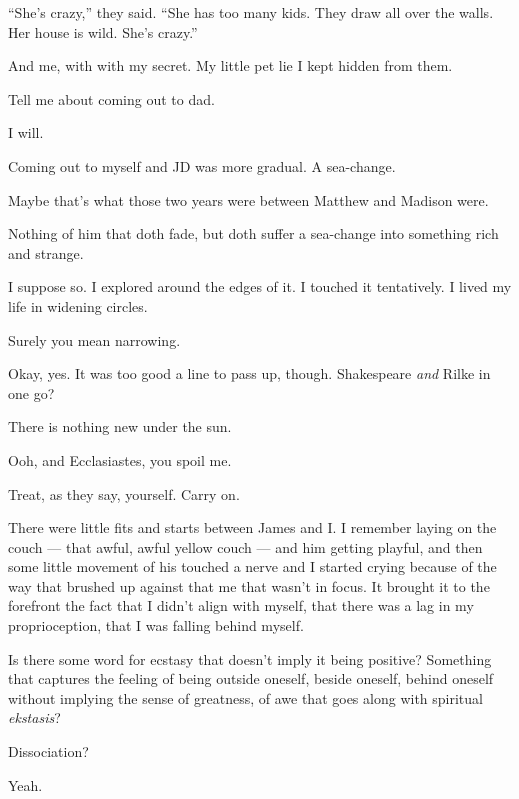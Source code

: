 \begin{paracol}{2}
\begin{leftcolumn}
\begin{ally}
``She's crazy,'' they said. ``She has too many kids. They draw all over the walls. Her house is wild. She's crazy.''
\end{ally}
And me, with with my secret. My little pet lie I kept hidden from them.

\begin{ally}
Tell me about coming out to dad.
\end{ally}
I will.
\newpage

\noindent Coming out to myself and JD was more gradual. A sea-change.

\begin{ally}
Maybe that's what those two years were between Matthew and Madison were.
\end{ally}
Nothing of him that doth fade, but doth suffer a sea-change into something rich and strange.

I suppose so. I explored around the edges of it. I touched it tentatively. I lived my life in widening circles.

\begin{ally}
Surely you mean narrowing.
\end{ally}
Okay, yes. It was too good a line to pass up, though. Shakespeare \emph{and} Rilke in one go?

\begin{ally}
There is nothing new under the sun.
\end{ally}
Ooh, and Ecclasiastes, you spoil me.

\begin{ally}
Treat, as they say, yourself. Carry on.
\end{ally}
There were little fits and starts between James and I. I remember laying on the couch --- that awful, awful yellow couch --- and him getting playful, and then some little movement of his touched a nerve and I started crying because of the way that brushed up against that me that wasn't in focus. It brought it to the forefront the fact that I didn't align with myself, that there was a lag in my proprioception, that I was falling behind myself.

Is there some word for ecstasy that doesn't imply it being positive? Something that captures the feeling of being outside oneself, beside oneself, behind oneself without implying the sense of greatness, of awe that goes along with spiritual \emph{ekstasis}?

\begin{ally}
Dissociation?
\end{ally}
Yeah.


\end{leftcolumn}
\end{paracol}
